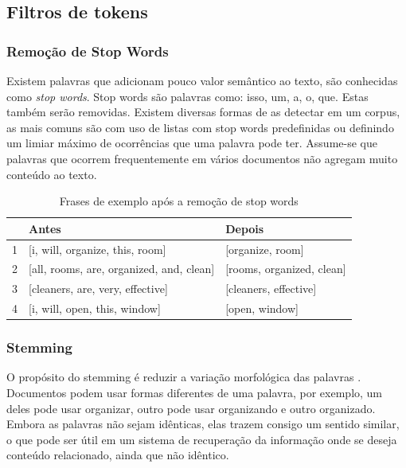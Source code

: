 \subsection{Filtros de tokens}
\subsubsection{Remoção de Stop Words}
Existem palavras que adicionam pouco valor semântico ao texto, são conhecidas como \textit{stop words}. Stop words são palavras como: isso, um, a, o, que. Estas também serão removidas. Existem diversas formas de as detectar em um corpus, as mais comuns são com uso de listas com stop words predefinidas ou definindo um limiar máximo de ocorrências que uma palavra pode ter. Assume-se que palavras que ocorrem frequentemente em vários documentos não agregam muito conteúdo ao texto.

\begin{table}[htb]
	\centering
    \def\arraystretch{1.2} %
    \begin{tabular}{|l|l|l|}
        \hline
        & \textbf{Antes} & \textbf{Depois} \\ \hline
        1 & [i, will, organize, this, room] & [organize, room]            \\ \hline
        2 & [all, rooms, are, organized, and, clean] & [rooms, organized, clean] \\ \hline
        3 & [cleaners, are, very, effective] & [cleaners, effective]                              \\ \hline
        4 & [i, will, open, this, window] & [open, window]                             \\ \hline
    \end{tabular}
	\caption{Frases de exemplo após a remoção de stop words}
    \label{tab:tokenfilter}
\end{table}

\subsubsection{Stemming}
O propósito do stemming é reduzir a variação morfológica das palavras \cite{stemmingdef}. Documentos podem usar formas diferentes de uma palavra, por exemplo, um deles pode usar organizar, outro pode usar organizando e outro organizado. Embora as palavras não sejam idênticas, elas trazem consigo um sentido similar, o que pode ser útil em um sistema de recuperação da informação onde se deseja conteúdo relacionado, ainda que não idêntico.

